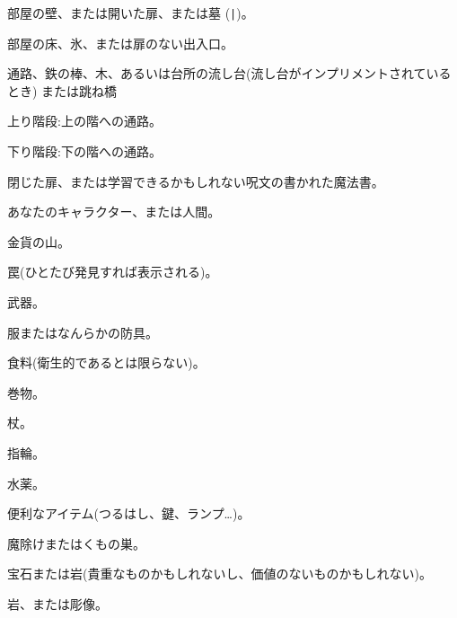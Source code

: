 \blist{}
\item[\tb{"- と |}]
部屋の壁、または開いた扉、または墓 ({\tt |})。
\item[\tb{.}]
部屋の床、氷、または扉のない出入口。
\item[\tb{\#}]
通路、鉄の棒、木、あるいは台所の流し台(流し台がインプリメントされているとき)
または跳ね橋
\item[\tb{>}]
上り階段:上の階への通路。
\item[\tb{<}]
下り階段:下の階への通路。
\item[\tb{+}]
閉じた扉、または学習できるかもしれない呪文の書かれた魔法書。
\item[\tb{@}]
あなたのキャラクター、または人間。
\item[\tb{\$}]
金貨の山。
\item[\tb{\^}]
罠(ひとたび発見すれば表示される)。
\item[\tb{)}]
武器。
\item[\tb{[}]
服またはなんらかの防具。
\item[\tb{\%}]
食料(衛生的であるとは限らない)。
\item[\tb{?}]
巻物。
\item[\tb{/}]
杖。
\item[\tb{=}]
指輪。
\item[\tb{!}]
水薬。
\item[\tb{(}]
便利なアイテム(つるはし、鍵、ランプ…)。
\item[\tb{"}]
魔除けまたはくもの巣。
\item[\tb{*}]
宝石または岩(貴重なものかもしれないし、価値のないものかもしれない)。
\item[\tb{\`}]
岩、または彫像。
\item[\tb{0}]
